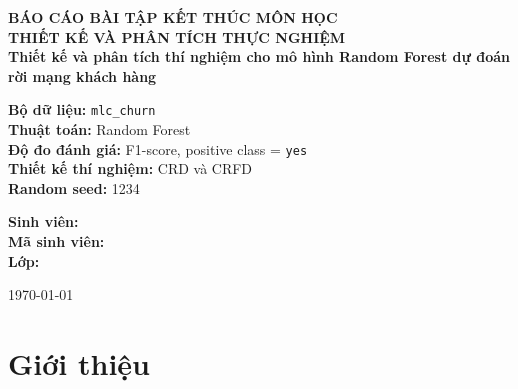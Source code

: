 \documentclass[12pt,a4paper]{article}
\begin{document}
\begin{titlepage}
    \centering
    \vspace*{1.5cm}

    {\Large \textbf{BÁO CÁO BÀI TẬP KẾT THÚC MÔN HỌC}}\\[0.5cm]
    {\Large \textbf{THIẾT KẾ VÀ PHÂN TÍCH THỰC NGHIỆM}}\\[1.5cm]

    {\LARGE \textbf{Thiết kế và phân tích thí nghiệm cho mô hình Random Forest dự đoán rời mạng khách hàng}}\\[1.2cm]

    \begin{flushleft}
    \hspace{2.5cm}\textbf{Bộ dữ liệu:} \texttt{mlc\_churn}\\
    \hspace{2.5cm}\textbf{Thuật toán:} Random Forest\\
    \hspace{2.5cm}\textbf{Độ đo đánh giá:} F1-score, positive class = \texttt{yes}\\
    \hspace{2.5cm}\textbf{Thiết kế thí nghiệm:} CRD và CRFD\\
    \hspace{2.5cm}\textbf{Random seed:} 1234\\
    \end{flushleft}

    \vfill

    \begin{flushleft}
    \hspace{2.5cm}\textbf{Sinh viên:} \underline{\hspace{7cm}}\\[0.3cm]
    \hspace{2.5cm}\textbf{Mã sinh viên:} \underline{\hspace{6.5cm}}\\[0.3cm]
    \hspace{2.5cm}\textbf{Lớp:} \underline{\hspace{8cm}}\\
    \end{flushleft}

    \vfill

    {\large \today}
\end{titlepage}

\tableofcontents
\newpage

\section{Giới thiệu}
\end{document}
